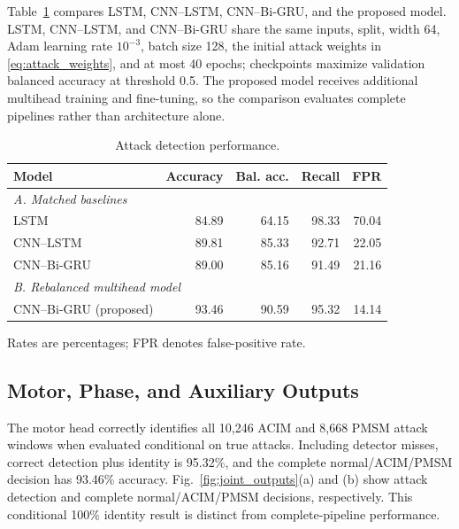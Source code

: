 \documentclass[conference]{IEEEtran}
\begin{document}
Table~\ref{tab:comparison} compares LSTM, CNN--LSTM, CNN--Bi-GRU, and the proposed model. LSTM, CNN--LSTM, and CNN--Bi-GRU share the same inputs, split, width 64, Adam learning rate $10^{-3}$, batch size 128, the initial attack weights in \eqref{eq:attack_weights}, and at most 40 epochs; checkpoints maximize validation balanced accuracy at threshold 0.5. The proposed model receives additional multihead training and fine-tuning, so the comparison evaluates complete pipelines rather than architecture alone.


\begin{table}[!t]
\centering
\caption{Attack detection performance. }
\label{tab:comparison}
\setlength{\tabcolsep}{3pt}
\small
\begin{tabular}{lrrrr}
\toprule
Model & Accuracy & Bal. acc. & Recall & FPR \\
\midrule
\multicolumn{5}{l}{\textit{A. Matched baselines}} \\
LSTM & 84.89 & 64.15 & 98.33 & 70.04 \\
CNN--LSTM & 89.81 & 85.33 & 92.71 & 22.05 \\
CNN--Bi-GRU & 89.00 & 85.16 & 91.49 & 21.16 \\
\midrule
\multicolumn{5}{l}{\textit{B. Rebalanced multihead model}} \\
CNN--Bi-GRU (proposed) & 93.46 & 90.59 & 95.32 & 14.14 \\
\bottomrule
\end{tabular}
\par\vspace{2pt}
\begin{minipage}{\linewidth}\footnotesize Rates are percentages; FPR denotes false-positive rate. 
\end{minipage}
\end{table}


















\subsection{Motor, Phase, and Auxiliary Outputs}
The motor head correctly identifies all 10,246 ACIM and 8,668 PMSM attack windows when evaluated conditional on true attacks. Including detector misses, correct detection plus identity is 95.32\%, and the complete normal/ACIM/PMSM decision has 93.46\% accuracy. Fig.~\ref{fig:joint_outputs}(a) and (b) show attack detection and complete normal/ACIM/PMSM decisions, respectively. This conditional 100\% identity result is distinct from complete-pipeline performance.
\end{document}
